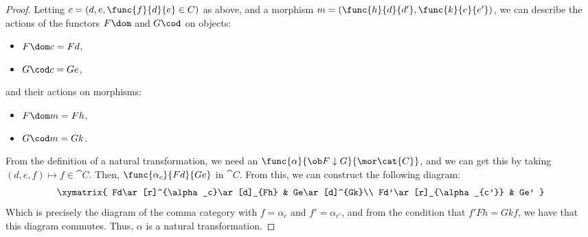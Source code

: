 \documentclass[main.tex]{subfiles}
\begin{document}
\begin{proof}
	Letting $c=(d,e,\func{f}{d}{e}\in C)$ as above, and a morphism
	$m=(\func{h}{d}{d'},\func{k}{e}{e'})$, we can describe the actions of the
	functors $F\dom$ and $G\cod$ on objects:
	\begin{itemize}
		\item $F\dom c = Fd$,
		\item $G\cod c = Ge$,
	\end{itemize}
	and their actions on morphisms:
	\begin{itemize}
		\item $F\dom m = Fh$,
		\item $G\cod m = Gk$.
	\end{itemize}
	From the definition of a natural transformation, we need an
	$\func{\alpha}{\ob F\downarrow G}{\mor\cat{C}}$, and we can get this by
	taking $(d,e,f)\mapsto f\in \cat{C}$. Then, $\func{\alpha_c}{Fd}{Ge}$ in
	$\cat{C}$. From this, we can construct the following diagram:
	\[\xymatrix{
		Fd\ar[r]^{\alpha_c}\ar[d]_{Fh} & Ge\ar[d]^{Gk}\\
		Fd'\ar[r]_{\alpha_{c'}} & Ge'
	}\]
	Which is precisely the diagram of the comma category with $f=\alpha_c$ and
	$f'=\alpha_{c'}$, and from the condition that $f'Fh = Gk f$, we
	have that this diagram commutes. Thus, $\alpha$ is a natural
	transformation.
\end{proof}
\end{document}
